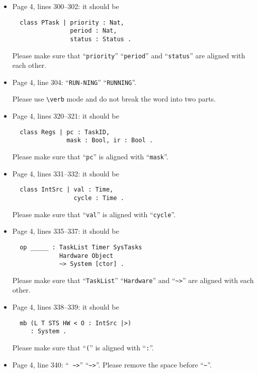 \documentclass[12pt,onecolumn]{IEEEtranTIE}
\begin{document}
\begin{itemize}
\item Page 4, lines 300--302: it should be
\begin{verbatim}
  class PTask | priority : Nat, 
                period : Nat, 
                status : Status .
\end{verbatim}

Please make sure that ``\verb|priority|'' ``\verb|period|'' and
``\verb|status|'' are aligned with each other.

\item Page 4, line 304: ``\verb|RUN-NING|'' \by ``\verb|RUNNING|''.

Please use \verb|\verb| mode and do not break the word into two parts.

\item Page 4, lines 320--321: it should be
\begin{verbatim}
  class Regs | pc : TaskID, 
               mask : Bool, ir : Bool .
\end{verbatim}

Please make sure that ``\verb|pc|'' is aligned with ``\verb|mask|''.

\item Page 4, lines 331--332: it should be
\begin{verbatim}
  class IntSrc | val : Time, 
                 cycle : Time .
\end{verbatim}

Please make sure that ``\verb|val|'' is aligned with ``\verb|cycle|''.

\item Page 4, lines 335--337: it should be
\begin{verbatim}
  op _____ : TaskList Timer SysTasks 
             Hardware Object 
             ~> System [ctor] .
\end{verbatim}

Please make sure that ``\verb|TaskList|'' ``\verb|Hardware|'' and
``\verb|~>|'' are aligned with each other.


\item Page 4, lines 338--339: it should be
\begin{verbatim}
  mb (L T STS HW < O : IntSrc |>) 
     : System .
\end{verbatim}

Please make sure that ``\verb|(|'' is aligned with ``\verb|:|''.

\item Page 4, line 340: ``\verb| ~>|'' \by ``\verb|~>|''. Please
  remove the space before ``\verb|~|''.


\end{itemize}
\end{document}
